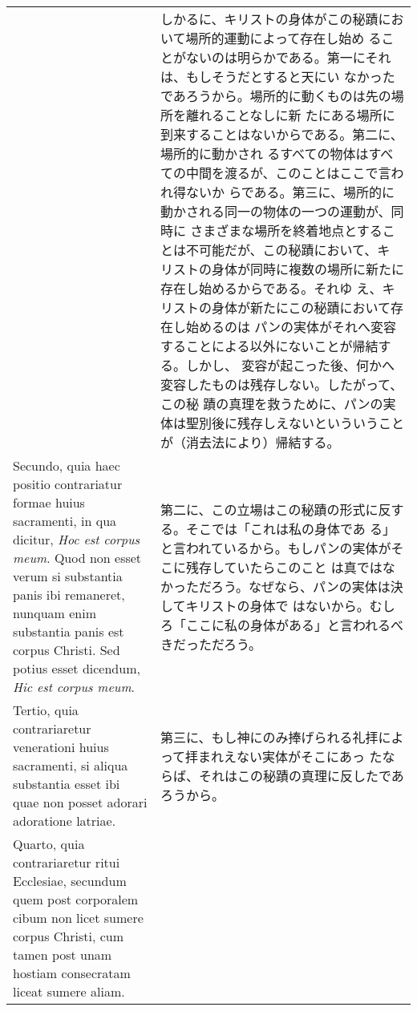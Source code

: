 \documentclass[10pt]{jsarticle} %
\begin{document}
\begin{longtable}{p{21em}p{21em}}
&

しかるに、キリストの身体がこの秘蹟において場所的運動によって存在し始め
 ることがないのは明らかである。第一にそれは、もしそうだとすると天にい
 なかったであろうから。場所的に動くものは先の場所を離れることなしに新
 たにある場所に到来することはないからである。第二に、場所的に動かされ
 るすべての物体はすべての中間を渡るが、このことはここで言われ得ないか
 らである。第三に、場所的に動かされる同一の物体の一つの運動が、同時に
 さまざまな場所を終着地点とすることは不可能だが、この秘蹟において、キ
 リストの身体が同時に複数の場所に新たに存在し始めるからである。それゆ
 え、キリストの身体が新たにこの秘蹟において存在し始めるのは
 パンの実体がそれへ変容することによる以外にないことが帰結する。しかし、
 変容が起こった後、何かへ変容したものは残存しない。したがって、この秘
 蹟の真理を救うために、パンの実体は聖別後に残存しえないといういうこと
 が（消去法により）帰結する。


\\



Secundo, quia haec positio contrariatur formae
huius sacramenti, in qua dicitur, {\itshape Hoc est corpus meum}. Quod non esset
verum si substantia panis ibi remaneret, nunquam enim substantia panis
est corpus Christi. Sed potius esset dicendum, {\itshape Hic est corpus
meum}. 


&

第二に、この立場はこの秘蹟の形式に反する。そこでは「これは私の身体であ
 る」と言われているから。もしパンの実体がそこに残存していたらこのこと
 は真ではなかっただろう。なぜなら、パンの実体は決してキリストの身体で
 はないから。むしろ「ここに私の身体がある」と言われるべきだっただろう。


\\



Tertio, quia contrariaretur venerationi huius sacramenti, si
aliqua substantia esset ibi quae non posset adorari adoratione
latriae. 


&


第三に、もし神にのみ捧げられる礼拝によって拝まれえない実体がそこにあっ
 たならば、それはこの秘蹟の真理に反したであろうから。

\\



Quarto, quia contrariaretur ritui Ecclesiae, secundum quem
post corporalem cibum non licet sumere corpus Christi, cum tamen post
unam hostiam consecratam liceat sumere aliam. 


\end{longtable}
\end{document}
